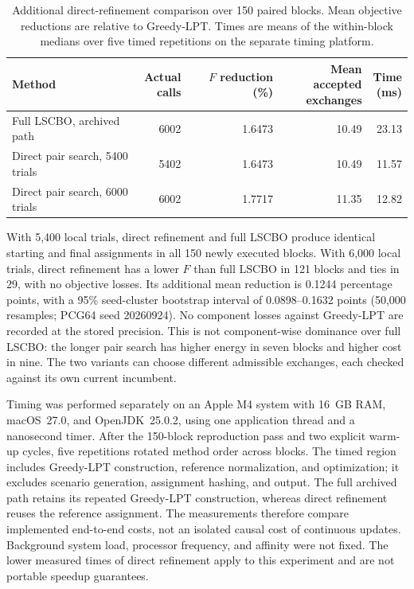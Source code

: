 \documentclass[pdflatex,onecolumn,sn-mathphys-num]{sn-jnl}
\begin{document}
\begin{table}[htbp]
\centering\small
\caption{Additional direct-refinement comparison over 150 paired blocks. Mean objective reductions are relative to Greedy-LPT. Times are means of the within-block medians over five timed repetitions on the separate timing platform.}\label{tab:direct_pair}
\begin{tabular}{p{}rrrr}
\toprule
Method & \shortstack{Actual\\calls} & \shortstack{$F$ reduction\\(\%)} & \shortstack{Mean accepted\\exchanges} & \shortstack{Time\\(ms)} \\
\midrule
Full LSCBO, archived path & 6002 & 1.6473 & 10.49 & 23.13 \\
Direct pair search, 5400 trials & 5402 & 1.6473 & 10.49 & 11.57 \\
Direct pair search, 6000 trials & 6002 & 1.7717 & 11.35 & 12.82 \\
\bottomrule
\end{tabular}
\end{table}

With 5,400 local trials, direct refinement and full LSCBO produce identical starting and final assignments in all 150 newly executed blocks. With 6,000 local trials, direct refinement has a lower $F$ than full LSCBO in 121 blocks and ties in 29, with no objective losses. Its additional mean reduction is 0.1244 percentage points, with a 95\% seed-cluster bootstrap interval of 0.0898--0.1632 points (50,000 resamples; PCG64 seed 20260924). No component losses against Greedy-LPT are recorded at the stored precision. This is not component-wise dominance over full LSCBO: the longer pair search has higher energy in seven blocks and higher cost in nine. The two variants can choose different admissible exchanges, each checked against its own current incumbent.

Timing was performed separately on an Apple M4 system with 16~GB RAM, macOS~27.0, and OpenJDK~25.0.2, using one application thread and a nanosecond timer. After the 150-block reproduction pass and two explicit warm-up cycles, five repetitions rotated method order across blocks. The timed region includes Greedy-LPT construction, reference normalization, and optimization; it excludes scenario generation, assignment hashing, and output. The full archived path retains its repeated Greedy-LPT construction, whereas direct refinement reuses the reference assignment. The measurements therefore compare implemented end-to-end costs, not an isolated causal cost of continuous updates. Background system load, processor frequency, and affinity were not fixed. The lower measured times of direct refinement apply to this experiment and are not portable speedup guarantees.
\end{document}
